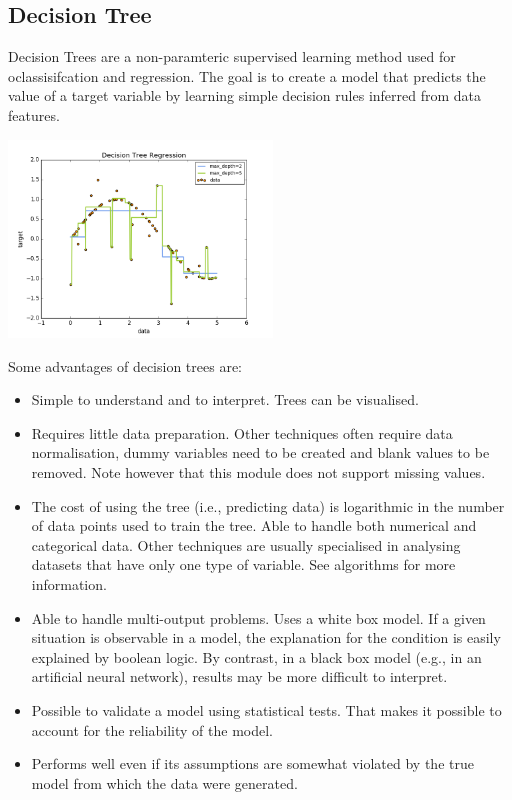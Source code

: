 \documentclass[12pt]{article}
\begin{document}
		\subsection{Decision Tree}
		\textnormal{Decision Trees are a non-paramteric supervised learning method used for oclassisifcation and regression. The goal is to create a model that predicts the value of a target variable by learning simple decision rules inferred from data features.}
		\begin{center}
			\includegraphics[width=7cm]{dt}
		\end{center}
		Some advantages of decision trees are:
		\begin{itemize}
			\item Simple to understand and to interpret. Trees can be visualised.
			\item Requires little data preparation. Other techniques often require data normalisation, dummy variables need to be created and blank values to be removed. Note however that this module does not support missing values.
			\item The cost of using the tree (i.e., predicting data) is logarithmic in the number of data points used to train the tree.
			Able to handle both numerical and categorical data. Other techniques are usually specialised in analysing datasets that have only one type of variable. See algorithms for more information.
			\item Able to handle multi-output problems.
			Uses a white box model. If a given situation is observable in a model, the explanation for the condition is easily explained by boolean logic. By contrast, in a black box model (e.g., in an artificial neural network), results may be more difficult to interpret.
			\item Possible to validate a model using statistical tests. That makes it possible to account for the reliability of the model.
			\item Performs well even if its assumptions are somewhat violated by the true model from which the data were generated.
			
		\end{itemize}
\end{document}
